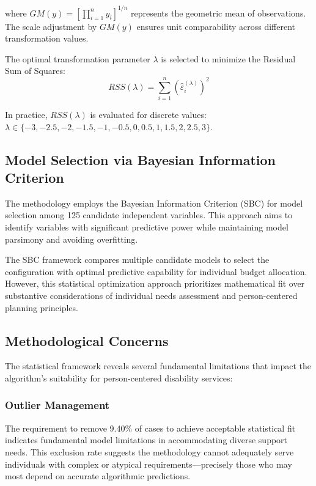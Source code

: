 where $GM(y) = \left[\prod_{i=1}^n y_i\right]^{1/n}$ represents the geometric mean of observations. The scale adjustment by $GM(y)$ ensures unit comparability across different transformation values.

The optimal transformation parameter $\lambda$ is selected to minimize the Residual Sum of Squares:
\begin{equation}
RSS(\lambda) = \sum_{i=1}^n \left(\hat{\varepsilon}_i^{(\lambda)}\right)^2
\end{equation}

In practice, $RSS(\lambda)$ is evaluated for discrete values: \\ $\lambda \in \{-3, -2.5, -2, -1.5, -1, -0.5, 0, 0.5, 1, 1.5, 2, 2.5, 3\}$.

\subsection{Model Selection via Bayesian Information Criterion}

The methodology employs the Bayesian Information Criterion (SBC) for model selection among 125 candidate independent variables. This approach aims to identify variables with significant predictive power while maintaining model parsimony and avoiding overfitting.

The SBC framework compares multiple candidate models to select the configuration with optimal predictive capability for individual budget allocation. However, this statistical optimization approach prioritizes mathematical fit over substantive considerations of individual needs assessment and person-centered planning principles.

\subsection{Methodological Concerns}

The statistical framework reveals several fundamental limitations that impact the algorithm's suitability for person-centered disability services:

\subsubsection{Outlier Management}
The requirement to remove 9.40\% of cases to achieve acceptable statistical fit indicates fundamental model limitations in accommodating diverse support needs. This exclusion rate suggests the methodology cannot adequately serve individuals with complex or atypical requirements—precisely those who may most depend on accurate algorithmic predictions.

